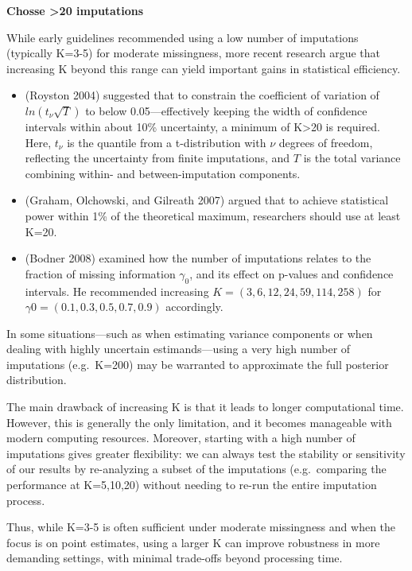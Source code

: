 \documentclass{article}
\providecommand{\tightlist}{%
  \setlength{\itemsep}{0pt}\setlength{\parskip}{0pt}}
\begin{document}
\textbf{Chosse \textgreater20 imputations}

While early guidelines recommended using a low number of imputations
(typically K=3-5) for moderate missingness, more recent research argue
that increasing K beyond this range can yield important gains in
statistical efficiency.

\begin{itemize}
\tightlist
\item
  (Royston 2004) suggested that to constrain the coefficient of
  variation of \(ln(t_{\nu}\sqrt{T})\) to below 0.05---effectively
  keeping the width of confidence intervals within about 10\%
  uncertainty, a minimum of K\textgreater20 is required. Here,
  \(t_{\nu}\) is the quantile from a t-distribution with \({\nu}\)
  degrees of freedom, reflecting the uncertainty from finite
  imputations, and \(T\) is the total variance combining within- and
  between-imputation components.
\item
  (Graham, Olchowski, and Gilreath 2007) argued that to achieve
  statistical power within 1\% of the theoretical maximum, researchers
  should use at least K=20.
\item
  (Bodner 2008) examined how the number of imputations relates to the
  fraction of missing information \(\gamma_{0}\), and its effect on
  p-values and confidence intervals. He recommended increasing
  \(K=(3,6,12,24,59,114,258)\) for \(\gamma0=(0.1, 0.3, 0.5, 0.7, 0.9)\)
  accordingly.
\end{itemize}

In some situations---such as when estimating variance components or when
dealing with highly uncertain estimands---using a very high number of
imputations (e.g.~K=200) may be warranted to approximate the full
posterior distribution.

The main drawback of increasing K is that it leads to longer
computational time. However, this is generally the only limitation, and
it becomes manageable with modern computing resources. Moreover,
starting with a high number of imputations gives greater flexibility: we
can always test the stability or sensitivity of our results by
re-analyzing a subset of the imputations (e.g.~comparing the performance
at K=5,10,20) without needing to re-run the entire imputation process.

Thus, while K=3-5 is often sufficient under moderate missingness and
when the focus is on point estimates, using a larger K can improve
robustness in more demanding settings, with minimal trade-offs beyond
processing time.
\end{document}
